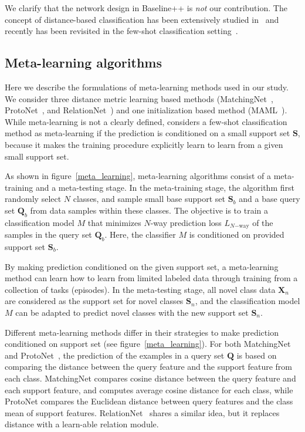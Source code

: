 We clarify that the network design in Baseline++ is \emph{not} our contribution. The concept of distance-based classification has been extensively studied in~\cite{mensink2012metric} and recently has been revisited in the few-shot classification setting~\cite{gidaris2018dynamic,qi2018low}. 

\subsection{Meta-learning algorithms}
\label{sec:meta-learning}

Here we describe the formulations of meta-learning methods used in our study. We consider three distance metric learning based methods (MatchingNet~\cite{vinyals2016matching}, ProtoNet~\cite{snell2017prototypical}, and RelationNet~\cite{sung2018learning}) and one initialization based method (MAML~\cite{finn2017model}). While meta-learning is not a clearly defined, \cite{vinyals2016matching} considers a few-shot classification method as meta-learning if the prediction is conditioned on a small support set $\mathbf{S}$, because it makes the training procedure explicitly learn to learn from a given small support set. 

As shown in figure~\ref{meta_learning}, meta-learning algorithms consist of a meta-training and a meta-testing stage. In the meta-training stage, the algorithm first randomly select $N$ classes, and sample small base support set $\mathbf{S}_b$ and a base query set $\mathbf{Q}_b$ from data samples within these classes. The objective is to train a classification model $M$ that minimizes $N$-way prediction loss $L_{N\mathrm{-way}}$ of the samples in the query set $\mathbf{Q}_b$. 
Here, the classifier $M$ is conditioned on provided support set $\mathbf{S}_b$. 

By making prediction conditioned on the given support set, a meta-learning method can learn how to learn from limited labeled data through training from a collection of tasks (episodes). In the meta-testing stage, all novel class data $\mathbf{X}_n$ are considered as the support set for novel classes $\mathbf{S}_n$, and the classification model $M$ can be adapted to predict novel classes with the new support set $\mathbf{S}_n$. 

Different meta-learning methods differ in their strategies to make prediction conditioned on support set (see figure~\ref{meta_learning}). For both MatchingNet~\cite{vinyals2016matching} and ProtoNet~\cite{snell2017prototypical}, the prediction of the examples in a query set $\mathbf{Q}$ is based on comparing the distance between the query feature and the support feature from each class. MatchingNet compares cosine distance between the query feature and each support feature, and computes average cosine distance for each class, while ProtoNet compares the Euclidean distance between query features and the class mean of support features. RelationNet~\cite{sung2018learning} shares a similar idea, but it replaces distance with a learn-able relation module. 

